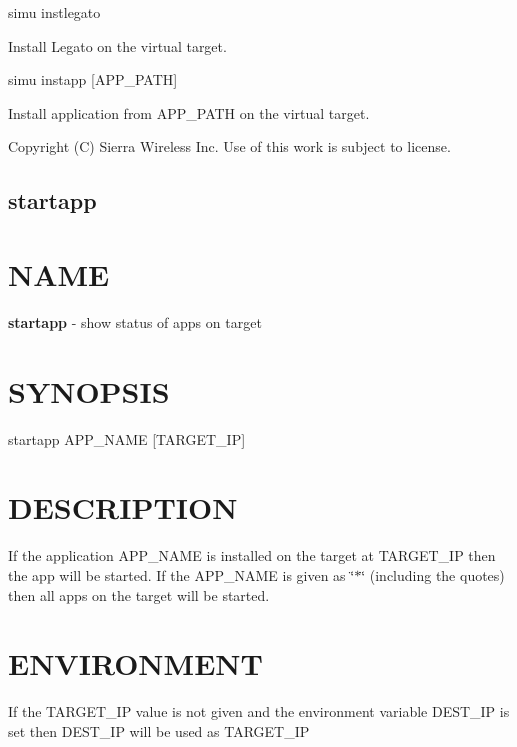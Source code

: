 simu instlegato
\begin{DoxyItemize}
\item Install Legato on the virtual target.
\end{DoxyItemize}

simu instapp \mbox{[}A\+P\+P\+\_\+\+P\+A\+T\+H\mbox{]}
\begin{DoxyItemize}
\item Install application from A\+P\+P\+\_\+\+P\+A\+T\+H on the virtual target.
\end{DoxyItemize}



 Copyright (C) Sierra Wireless Inc. Use of this work is subject to license. \hypertarget{toolsHost_startapp}{}\subsection{startapp}\label{toolsHost_startapp}
\section*{N\+A\+M\+E}

{\bfseries startapp} -\/ show status of apps on target

\section*{S\+Y\+N\+O\+P\+S\+I\+S}

{\ttfamily startapp A\+P\+P\+\_\+\+N\+A\+M\+E \mbox{[}T\+A\+R\+G\+E\+T\+\_\+\+I\+P\mbox{]}}~\newline


\section*{D\+E\+S\+C\+R\+I\+P\+T\+I\+O\+N}

If the application A\+P\+P\+\_\+\+N\+A\+M\+E is installed on the target at T\+A\+R\+G\+E\+T\+\_\+\+I\+P then the app will be started. If the A\+P\+P\+\_\+\+N\+A\+M\+E is given as \char`\"{}$\ast$\char`\"{} (including the quotes) then all apps on the target will be started.

\section*{E\+N\+V\+I\+R\+O\+N\+M\+E\+N\+T}

\begin{DoxyVerb}If the TARGET_IP value is not given and the environment variable DEST_IP
is set then DEST_IP will be used as TARGET_IP
\end{DoxyVerb}




